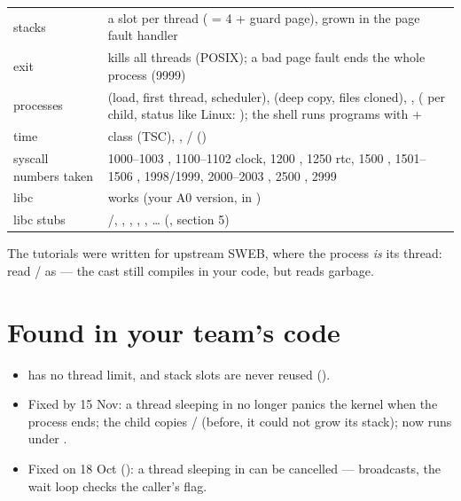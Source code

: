 \begin{center}
\begin{tabular}{L{4.6cm}L{10.2cm}}
stacks & a slot per thread ( = 4 + guard page), grown in the page fault handler \\
exit &  kills all threads (POSIX); a bad page fault ends the whole process (9999) \\
processes &  (load, first thread, scheduler),  (deep copy, files cloned), ,  ( per child, status like Linux: ); the shell runs programs with  +  \\
time & class  (TSC), ,  /  () \\
syscall numbers taken & 1000--1003 , 1100--1102 clock, 1200 , 1250 rtc, 1500 , 1501--1506 , 1998/1999, 2000--2003 , 2500 , 2999 \\
libc &  works (your A0 version,  in ) \\
libc stubs & /, , , , , \ldots{} (, section 5) \\
\bottomrule
\end{tabular}
\end{center}

The tutorials were written for upstream SWEB, where the process \emph{is} its thread: read
 /  as
 --- the cast still compiles in your code, but reads garbage.

\section*{Found in your team's code}

\begin{itemize}
\item {} has no thread limit, and stack slots are never reused
  ().
\item Fixed by 15 Nov: a thread sleeping in  no longer panics the kernel when
  the process ends; the  child copies  /
   (before, it could not grow its stack);  now
  runs under .
\item Fixed on 18 Oct (): a thread sleeping in  can
  be cancelled ---  broadcasts, the wait loop checks the caller's flag.
\end{itemize}

